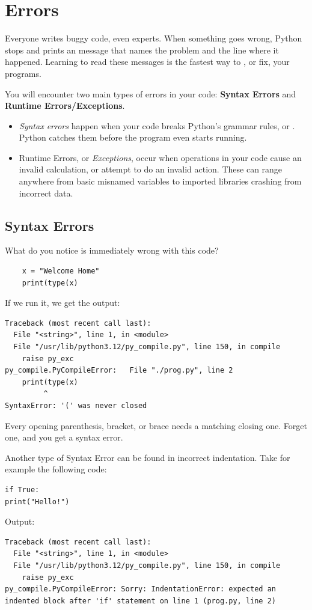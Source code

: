 \section{Errors}
Everyone writes buggy code, even experts. When something goes wrong, Python stops and prints an  message that names the problem and the line where it happened. Learning to read these messages is the fastest way to , or fix, your programs.

You will encounter two main types of errors in your code: \textbf{Syntax Errors} and \textbf{Runtime Errors/Exceptions}. 
\begin{itemize}
    \item \emph{Syntax errors} happen when your code breaks Python's grammar rules, or . Python catches them before the program even starts running.
    \item Runtime Errors, or \emph{Exceptions}, occur when operations in your code cause an invalid calculation, or attempt to do an invalid action. These can range anywhere from basic misnamed variables to imported libraries crashing from incorrect data.
\end{itemize}



\subsection{Syntax Errors}
What do you notice is immediately wrong with this code?
\begin{verbatim}
    x = "Welcome Home"
    print(type(x)
\end{verbatim}

If we run it, we get the output:
\begin{verbatim}
Traceback (most recent call last):
  File "<string>", line 1, in <module>
  File "/usr/lib/python3.12/py_compile.py", line 150, in compile
    raise py_exc
py_compile.PyCompileError:   File "./prog.py", line 2
    print(type(x)
         ^
SyntaxError: '(' was never closed
\end{verbatim}

Every opening parenthesis, bracket, or brace needs a matching closing one. Forget one, and you get a syntax error. 

Another type of Syntax Error can be found in incorrect indentation. Take for example the following code:
\begin{verbatim}
if True:
print("Hello!")
\end{verbatim}
Output:
\begin{verbatim}
Traceback (most recent call last):
  File "<string>", line 1, in <module>
  File "/usr/lib/python3.12/py_compile.py", line 150, in compile
    raise py_exc
py_compile.PyCompileError: Sorry: IndentationError: expected an indented block after 'if' statement on line 1 (prog.py, line 2)
\end{verbatim}

